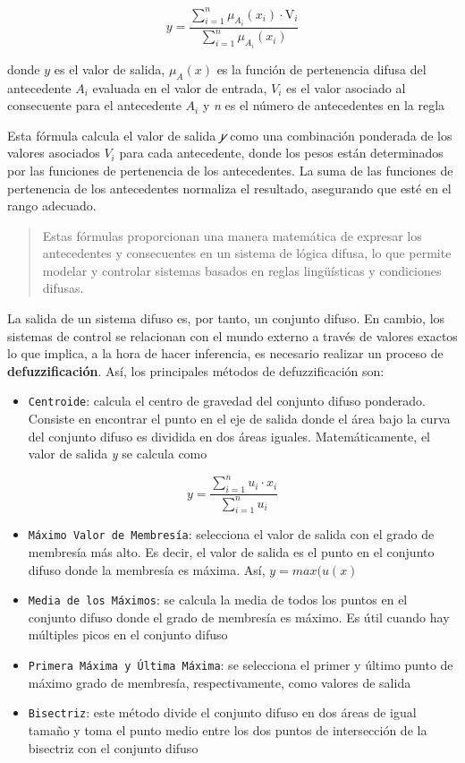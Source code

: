 \documentclass[
  a4paper,
  DIV=11,
  numbers=noendperiod]{scrreprt}
\providecommand{\tightlist}{%
  \setlength{\itemsep}{0pt}\setlength{\parskip}{0pt}}\usepackage{longtable,booktabs,array}
\begin{document}
\[ y = \frac{{\sum_{i=1}^{n} \mu_{A_i}(x_i) \cdot \text{V}_i}}{{\sum_{i=1}^{n} \mu_{A_i}(x_i)}} \]

donde \(y\) es el valor de salida, \(\mu_A(x)\) es la función de
pertenencia difusa del antecedente \(A_i\) evaluada en el valor de
entrada, \(V_i\) es el valor asociado al consecuente para el antecedente
\(A_i\) y \emph{n} es el número de antecedentes en la regla

Esta fórmula calcula el valor de salida \emph{𝑦} como una combinación
ponderada de los valores asociados \(V_i\) para cada antecedente, donde
los pesos están determinados por las funciones de pertenencia de los
antecedentes. La suma de las funciones de pertenencia de los
antecedentes normaliza el resultado, asegurando que esté en el rango
adecuado.

\begin{quote}
Estas fórmulas proporcionan una manera matemática de expresar los
antecedentes y consecuentes en un sistema de lógica difusa, lo que
permite modelar y controlar sistemas basados en reglas lingüísticas y
condiciones difusas.
\end{quote}

La salida de un sistema difuso es, por tanto, un conjunto difuso. En
cambio, los sistemas de control se relacionan con el mundo externo a
través de valores exactos lo que implica, a la hora de hacer inferencia,
es necesario realizar un proceso de \textbf{defuzzificación}. Así, los
principales métodos de defuzzificación son:

\begin{itemize}
\tightlist
\item
  \texttt{Centroide}: calcula el centro de gravedad del conjunto difuso
  ponderado. Consiste en encontrar el punto en el eje de salida donde el
  área bajo la curva del conjunto difuso es dividida en dos áreas
  iguales. Matemáticamente, el valor de salida \emph{y} se calcula como
\end{itemize}

\[ y = \frac{{\sum_{i=1}^{n} u_i \cdot x_i}}{{\sum_{i=1}^{n} u_i}} \]

\begin{itemize}
\item
  \texttt{Máximo\ Valor\ de\ Membresía}: selecciona el valor de salida
  con el grado de membresía más alto. Es decir, el valor de salida es el
  punto en el conjunto difuso donde la membresía es máxima. Así,
  \(y = max(u(x)\)
\item
  \texttt{Media\ de\ los\ Máximos}: se calcula la media de todos los
  puntos en el conjunto difuso donde el grado de membresía es máximo. Es
  útil cuando hay múltiples picos en el conjunto difuso
\item
  \texttt{Primera\ Máxima\ y\ Última\ Máxima}: se selecciona el primer y
  último punto de máximo grado de membresía, respectivamente, como
  valores de salida
\item
  \texttt{Bisectriz}: este método divide el conjunto difuso en dos áreas
  de igual tamaño y toma el punto medio entre los dos puntos de
  intersección de la bisectriz con el conjunto difuso
\end{itemize}
\end{document}
